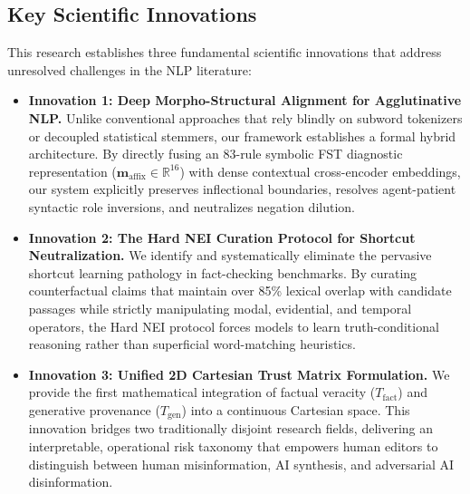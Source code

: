 \subsection{Key Scientific Innovations}
This research establishes three fundamental scientific innovations that address unresolved challenges in the NLP literature:

\begin{itemize}[leftmargin=*, label=$\bigstar$]
    \item \textbf{Innovation 1: Deep Morpho-Structural Alignment for Agglutinative NLP.} Unlike conventional approaches that rely blindly on subword tokenizers or decoupled statistical stemmers, our framework establishes a formal hybrid architecture. By directly fusing an 83-rule symbolic FST diagnostic representation ($\mathbf{m}_{\text{affix}} \in \mathbb{R}^{16}$) with dense contextual cross-encoder embeddings, our system explicitly preserves inflectional boundaries, resolves agent-patient syntactic role inversions, and neutralizes negation dilution.
    \item \textbf{Innovation 2: The Hard NEI Curation Protocol for Shortcut Neutralization.} We identify and systematically eliminate the pervasive shortcut learning pathology in fact-checking benchmarks. By curating counterfactual claims that maintain over 85\% lexical overlap with candidate passages while strictly manipulating modal, evidential, and temporal operators, the Hard NEI protocol forces models to learn truth-conditional reasoning rather than superficial word-matching heuristics.
    \item \textbf{Innovation 3: Unified 2D Cartesian Trust Matrix Formulation.} We provide the first mathematical integration of factual veracity ($T_{\text{fact}}$) and generative provenance ($T_{\text{gen}}$) into a continuous Cartesian space. This innovation bridges two traditionally disjoint research fields, delivering an interpretable, operational risk taxonomy that empowers human editors to distinguish between human misinformation, AI synthesis, and adversarial AI disinformation.
\end{itemize}

